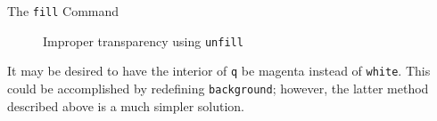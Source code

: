 \begin{subsection}{The \texttt{fill} Command}
\begin{figure}[ht]
	\caption{Improper transparency using \texttt{unfill}}\label{fig:annulus3}
\end{figure}
It may be desired to have the interior of \texttt{q} be magenta instead of \texttt{white}.  This could be accomplished by redefining \texttt{background}; however, the latter method described above is a much simpler solution.
\end{subsection}
